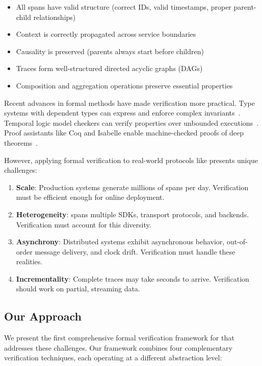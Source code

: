 \begin{itemize}
\item All spans have valid structure (correct IDs, valid timestamps, proper parent-child relationships)
\item Context is correctly propagated across service boundaries
\item Causality is preserved (parents always start before children)
\item Traces form well-structured directed acyclic graphs (DAGs)
\item Composition and aggregation operations preserve essential properties
\end{itemize}

Recent advances in formal methods have made verification more practical. Type systems with dependent types can express and enforce complex invariants~\cite{pierce2002types}. Temporal logic model checkers can verify properties over unbounded executions~\cite{clarke1999model}. Proof assistants like Coq and Isabelle enable machine-checked proofs of deep theorems~\cite{bertot2013coq}.

However, applying formal verification to real-world protocols like \otlp presents unique challenges:

\begin{enumerate}
\item \textbf{Scale}: Production systems generate millions of spans per day. Verification must be efficient enough for online deployment.
\item \textbf{Heterogeneity}: \otlp spans multiple SDKs, transport protocols, and backends. Verification must account for this diversity.
\item \textbf{Asynchrony}: Distributed systems exhibit asynchronous behavior, out-of-order message delivery, and clock drift. Verification must handle these realities.
\item \textbf{Incrementality}: Complete traces may take seconds to arrive. Verification should work on partial, streaming data.
\end{enumerate}

\subsection{Our Approach}
\label{sec:approach}

We present the first comprehensive formal verification framework for \otlp that addresses these challenges. Our framework combines four complementary verification techniques, each operating at a different abstraction level:

